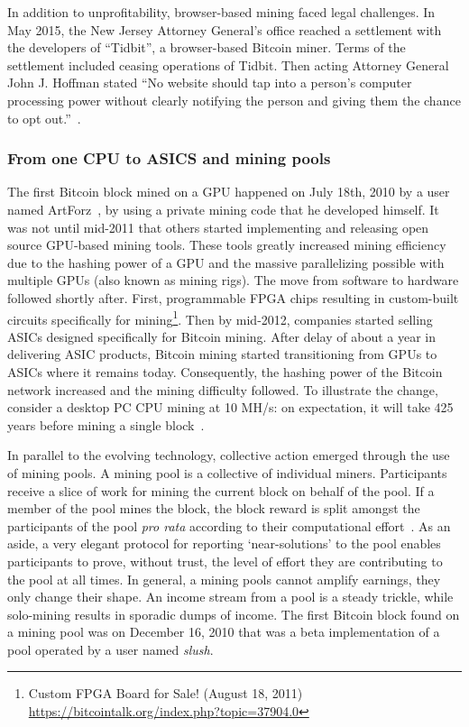In addition to unprofitability, browser-based mining faced legal challenges. In May 2015, the New Jersey Attorney General's office reached a settlement with the developers of ``Tidbit'', a browser-based Bitcoin miner. Terms of the settlement included ceasing operations of Tidbit. Then acting Attorney General John J. Hoffman stated ``No website should tap into a person's computer processing power without clearly notifying the person and giving them the chance to opt out.''~\cite{njcourtbitcoinjsminer}.

\subsubsection{From one CPU to ASICS and mining pools} \label{sec:cryptojackingasic}


The first Bitcoin block mined on a GPU happened on July 18th, 2010 by a user named ArtForz~\cite{bitcoinhistory}, by using a private mining code that he developed himself. It was not until mid-2011 that others started implementing and releasing open source GPU-based mining tools. These tools greatly increased mining efficiency due to the hashing power of a GPU and the massive parallelizing possible with multiple GPUs (also known as mining rigs). The move from software to hardware followed shortly after. First, programmable FPGA chips resulting in custom-built circuits specifically for mining\footnote{Custom FPGA Board for Sale! (August 18, 2011) \url{https://bitcointalk.org/index.php?topic=37904.0}}. Then by mid-2012, companies started selling ASICs designed specifically for Bitcoin mining. After delay of about a year in delivering ASIC products, Bitcoin mining started transitioning from GPUs to ASICs where it remains today. Consequently, the hashing power of the Bitcoin network increased and the mining difficulty followed. To illustrate the change, consider a desktop PC CPU mining at 10 MH/s: on expectation, it will take 425 years before mining a single block~\cite{huang2014botcoin}. 

In parallel to the evolving technology, collective action emerged through the use of mining pools. A mining pool is a collective of individual miners. Participants receive a slice of work for mining the current block on behalf of the pool. If a member of the pool mines the block, the block reward is split amongst the participants of the pool \textit{pro rata} according to their computational effort~\cite{rosenfeld2011analysis}. As an aside, a very elegant protocol for reporting `near-solutions' to the pool enables participants to prove, without trust, the level of effort they are contributing to the pool at all times. In general, a mining pools cannot amplify earnings, they only change their shape. An income stream from a pool is a steady trickle, while solo-mining results in sporadic dumps of income. The first Bitcoin block found on a mining pool was on December 16, 2010 that was a beta implementation of a pool operated by a user named \textit{slush}.

